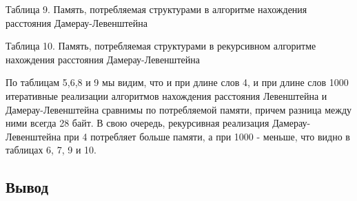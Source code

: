 \documentclass[a4paper, 14pt]{article}
\begin{document}
\begin{center}
\begin{flushleft}
	\begin{center}
  	Таблица 9. Память, потребляемая структурами в алгоритме нахождения расстояния Дамерау-Левенштейна\\
	\end{center}

	\begin{center}
  	Таблица 10. Память, потребляемая структурами в рекурсивном алгоритме нахождения расстояния Дамерау-Левенштейна\\
	\end{center}

	
	\begin{flushleft}
	По таблицам 5,6,8 и 9 мы видим, что и при длине слов 4, и при длине слов 1000 итеративные реализации алгоритмов нахождения расстояния Левенштейна и Дамерау-Левенштейна сравнимы по потребляемой памяти, причем разница между ними всегда 28 байт. В свою очередь, рекурсивная реализация Дамерау-Левенштейна при 4 потребляет больше памяти, а при 1000 - меньше, что видно в таблицах 6, 7, 9 и 10.
	\end{flushleft}
  \begin{center}

   \subsection{Вывод}
    \end{center}  
    

\end{flushleft}
\end{center}
\end{document}
